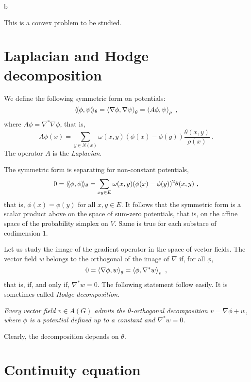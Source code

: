 b\documentclass[12pt,a4paper]{amsart}
\begin{document}
This is a convex problem to be studied. 

\section{Laplacian and Hodge decomposition}
\label{sec:laplacian}

We define the following symmetric form on potentials:
\begin{equation*}
  \left\langle\!\langle\phi,\psi\right\rangle\!\rangle_{\theta} = \left\langle\nabla\phi,\nabla\psi\right\rangle_{\theta} = \left\langle A \phi,\psi\right\rangle_{\rho} \ , 
\end{equation*}
where $A \phi = \nabla^* \nabla\phi$, that is,
\begin{equation*}
  A\phi(x) = \sum_{y \in N(x)} \omega(x,y) (\phi(x) - \phi(y))
  \frac{\theta(x,y)}{\rho(x)} \ .
\end{equation*}
The operator $A$ is the
\emph{Laplacian}.

The symmetric form is separating for non-constant potentials,
\begin{equation*}
  0 = \left\langle\!\langle\phi,\phi\right\rangle\!\rangle_{\theta} = \sum_{xy \in E} \omega(x,y)
  (\phi(x) - \phi(y))^2 \theta(x,y) \ , 
\end{equation*}
that is, $\phi(x) = \phi(y)$ for all $x,y \in E$. It follows that the
symmetric form is a scalar product above on the space of sum-zero
potentials, that is, on the affine space of the probability simplex on
$V$. Same is true for each substace of codimension 1.

Let us study the image of the gradient operator in the space of vector
fields. The vector field $w$ belongs to the  orthogonal of the image of
$\nabla$ if, for all $\phi$,
\begin{equation*}
  0 = \left\langle\nabla \phi,w\right\rangle_{\theta} = \left\langle\phi,\nabla^* w\right\rangle_{\rho} \ ,
\end{equation*}
that is, if, and only if, $\nabla^* w  = 0$. The following
statement follow easily. It is sometimes called \emph{Hodge decomposition}.

\emph{Every vector field $v \in A(G)$ admits the $\theta$-orthogonal
  decomposition $v = \nabla \phi + w$, where $\phi$ is a potential
  defined up to a constant and $\nabla^* w = 0$.}

Clearly, the decomposition depends on $\theta$.

\section{Continuity equation}
\label{sec:continuity}
\end{document}
